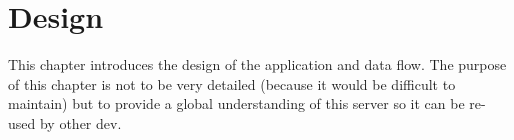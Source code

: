 \chapter{Design}
\label{chapter:design}

This chapter introduces the design of the application and data flow.
The purpose of this chapter is not to be very detailed (because it would be difficult to maintain)
but to provide a global understanding of this server so it can be re-used by other dev.


  
